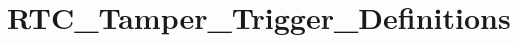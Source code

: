 \hypertarget{group___r_t_c___tamper___trigger___definitions}{\section{R\-T\-C\-\_\-\-Tamper\-\_\-\-Trigger\-\_\-\-Definitions}
\label{group___r_t_c___tamper___trigger___definitions}
}
